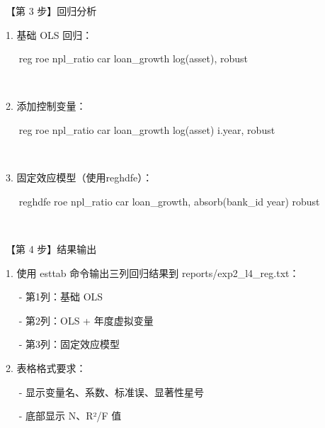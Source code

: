 \documentclass[
  american,
  chinese,
]{ctexart}
\begin{document}
{【第}\foreignlanguage{american}{ 3 }{步】回归分析}\foreignlanguage{american}{}

\foreignlanguage{american}{1. }{基础}\foreignlanguage{american}{ OLS }{回归：}\foreignlanguage{american}{}

\foreignlanguage{american}{{~~ }reg roe {npl\_ratio} car {loan\_growth}
log(asset), robust}

\foreignlanguage{american}{{~~ }}

\foreignlanguage{american}{2. }{添加控制变量：}\foreignlanguage{american}{}

\foreignlanguage{american}{{~~ }reg roe {npl\_ratio} car {loan\_growth}
log(asset) {{i.year}}, robust}

\foreignlanguage{american}{}

~

\foreignlanguage{american}{3. }{固定效应模型（使用}\foreignlanguage{american}{ {reghdfe}}{）：}\foreignlanguage{american}{}

\foreignlanguage{american}{{~~ }{reghdfe}
roe {npl\_ratio} car {loan\_growth},
{absorb(}{bank\_id} year) robust}

\foreignlanguage{american}{}

~

{【第}\foreignlanguage{american}{ 4 }{步】结果输出}\foreignlanguage{american}{}

\foreignlanguage{american}{1. }{使用}\foreignlanguage{american}{ {esttab} }{命令输出三列回归结果到}\foreignlanguage{american}{
reports/exp2\_l4\_reg.txt}{：}\foreignlanguage{american}{}

\foreignlanguage{american}{{~~ }- }{第}\foreignlanguage{american}{1}{列：基础}\foreignlanguage{american}{ OLS}

\foreignlanguage{american}{{~~ }- }{第}\foreignlanguage{american}{2}{列：}\foreignlanguage{american}{OLS + }{年度虚拟变量}\foreignlanguage{american}{}

\foreignlanguage{american}{{~~ }- }{第}\foreignlanguage{american}{3}{列：固定效应模型}\foreignlanguage{american}{}

\foreignlanguage{american}{2. }{表格格式要求：}\foreignlanguage{american}{}

\foreignlanguage{american}{{~~ }- }{显示变量名、系数、标准误、显著性星号}\foreignlanguage{american}{}

\foreignlanguage{american}{{~~ }- }{底部显示}\foreignlanguage{american}{ N}{、}\foreignlanguage{american}{R}{²}\foreignlanguage{american}{/F }{值}\foreignlanguage{american}{}
\end{document}
